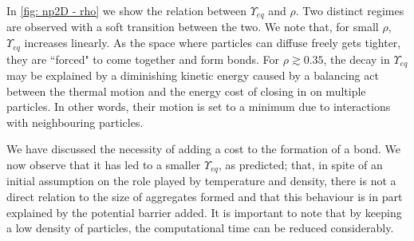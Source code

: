 \documentclass[../../main.tex]{subfiles}
\begin{document}
    In \cref{fig: np2D - rho} we show the relation between $\Upsilon_{eq}$ and $\rho$. Two distinct regimes are observed with a soft transition between the two. We note that, for small $\rho$, $\Upsilon_{eq}$ increases linearly. As the space where particles can diffuse freely gets tighter, they are ``forced" to come together and form bonds. For $\rho \gtrsim 0.35$, the decay in $\Upsilon_{eq}$ may be explained by a diminishing kinetic energy caused by a balancing act between the thermal motion and the energy cost of closing in on multiple particles. In other words, their motion is set to a minimum due to interactions with neighbouring particles.
    
    We have discussed the necessity of adding a cost to the formation of a bond. We now observe that it has led to a smaller $\Upsilon_{eq}$, as predicted; that, in spite of an initial assumption on the role played by temperature and density, there is not a direct relation to the size of aggregates formed and that this behaviour is in part explained by the potential barrier added. It is important to note that by keeping a low density of particles, the computational time can be reduced considerably. 
%
\end{document}
